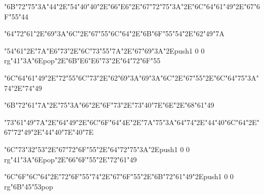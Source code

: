 \centerline{\ipa\char"6B\ipa\char"72\ipa\char"75\ipa\char"3A\ipa\char"44\ipa\char"2E\ipa\char"54\ipa\char"40\ipa\char"40\ipa\char"2E\ipa\char"66\ipa\char"E6\ipa\char"2E\ipa\char"67\ipa\char"72\ipa\char"75\ipa\char"3A\ipa\char"2E\ipa\char"6C\ipa\char"64\ipa\char"61\ipa\char"49\ipa\char"2E\ipa\char"67\ipa\char"6F\ipa\char"55\ipa\char"44}
\vfill\eject
\null\vfill
\centerline{\ipa\char"64\ipa\char"72\ipa\char"61\ipa\char"2E\ipa\char"69\ipa\char"3A\ipa\char"6C\ipa\char"2E\ipa\char"67\ipa\char"55\ipa\char"6C\ipa\char"64\ipa\char"2E\ipa\char"6B\ipa\char"6F\ipa\char"55\ipa\char"54\ipa\char"2E\ipa\char"62\ipa\char"49\ipa\char"7A}\bigskip
\centerline{\ipa\char"54\ipa\char"61\ipa\char"2E\ipa\char"7A\ipa\char"E6\ipa\char"73\ipa\char"2E\ipa\char"6C\ipa\char"73\ipa\char"55\ipa\char"7A\ipa\char"2E\ipa\char"67\ipa\char"69\ipa\char"3A\ipa\char"2E\pdfcolorstack\match push{1 0 0 rg}\ipa\char"41\ipa\char"3A\ipa\char"6E\pdfcolorstack\match pop{}\ipa\char"2E\ipa\char"6B\ipa\char"E6\ipa\char"E6\ipa\char"73\ipa\char"2E\ipa\char"64\ipa\char"72\ipa\char"6F\ipa\char"55}\bigskip
\centerline{\ipa\char"6C\ipa\char"64\ipa\char"61\ipa\char"49\ipa\char"2E\ipa\char"72\ipa\char"55\ipa\char"6C\ipa\char"73\ipa\char"2E\ipa\char"62\ipa\char"69\ipa\char"3A\ipa\char"69\ipa\char"3A\ipa\char"6C\ipa\char"2E\ipa\char"67\ipa\char"55\ipa\char"2E\ipa\char"6C\ipa\char"64\ipa\char"75\ipa\char"3A\ipa\char"74\ipa\char"2E\ipa\char"74\ipa\char"49}
\vfill\eject
\null\vfill
\centerline{\ipa\char"6B\ipa\char"72\ipa\char"61\ipa\char"7A\ipa\char"2E\ipa\char"75\ipa\char"3A\ipa\char"66\ipa\char"2E\ipa\char"6F\ipa\char"73\ipa\char"2E\ipa\char"73\ipa\char"40\ipa\char"7E\ipa\char"6E\ipa\char"2E\ipa\char"68\ipa\char"61\ipa\char"49}\bigskip
\centerline{\ipa\char"73\ipa\char"61\ipa\char"49\ipa\char"7A\ipa\char"2E\ipa\char"64\ipa\char"49\ipa\char"2E\ipa\char"6C\ipa\char"6F\ipa\char"64\ipa\char"4E\ipa\char"2E\ipa\char"7A\ipa\char"75\ipa\char"3A\ipa\char"64\ipa\char"74\ipa\char"2E\ipa\char"44\ipa\char"40\ipa\char"6C\ipa\char"64\ipa\char"2E\ipa\char"67\ipa\char"72\ipa\char"49\ipa\char"2E\ipa\char"44\ipa\char"40\ipa\char"7E\ipa\char"40\ipa\char"7E}\bigskip
\centerline{\ipa\char"6C\ipa\char"73\ipa\char"32\ipa\char"53\ipa\char"2E\ipa\char"67\ipa\char"72\ipa\char"6F\ipa\char"55\ipa\char"2E\ipa\char"64\ipa\char"72\ipa\char"75\ipa\char"3A\ipa\char"2E\pdfcolorstack\match push{1 0 0 rg}\ipa\char"41\ipa\char"3A\ipa\char"6E\pdfcolorstack\match pop{}\ipa\char"2E\ipa\char"66\ipa\char"6F\ipa\char"55\ipa\char"2E\ipa\char"72\ipa\char"61\ipa\char"49}
\vfill\eject
\null\vfill
\centerline{\ipa\char"6C\ipa\char"6F\ipa\char"6C\ipa\char"64\ipa\char"2E\ipa\char"72\ipa\char"6F\ipa\char"55\ipa\char"74\ipa\char"2E\ipa\char"67\ipa\char"6F\ipa\char"55\ipa\char"2E\ipa\char"6B\ipa\char"72\ipa\char"61\ipa\char"49\ipa\char"2E\pdfcolorstack\match push{1 0 0 rg}\ipa\char"6B\ipa\char"45\ipa\char"53\pdfcolorstack\match pop{}}\bigskip
